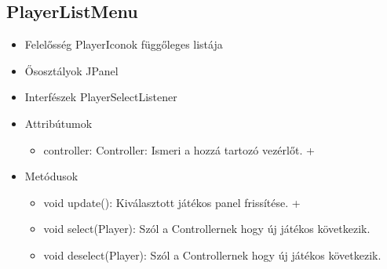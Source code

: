 \subsection{PlayerListMenu}
\begin{itemize}
	\item Felelősség\newline
	PlayerIconok függőleges listája
	\item Ősosztályok\newline
	JPanel
	\item Interfészek\newline
	PlayerSelectListener
	\item Attribútumok\newline
	\begin{itemize}
		\item controller: Controller: Ismeri a hozzá tartozó vezérlőt. +	
	\end{itemize}
	\item Metódusok\newline
	\begin{itemize}
		\item void update(): Kiválasztott játékos panel frissítése. +
		\item void select(Player): Szól a Controllernek hogy új játékos következik.
		\item void deselect(Player): Szól a Controllernek hogy új játékos következik.
	\end{itemize}
\end{itemize}

